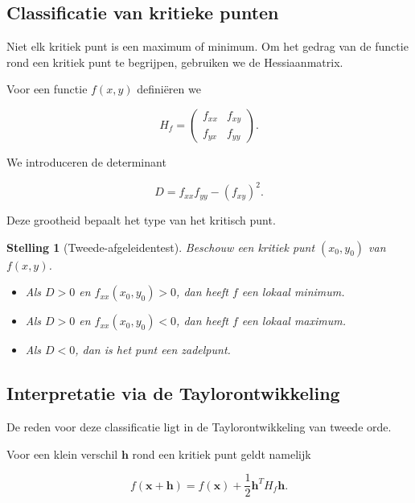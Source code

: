 \documentclass[11pt,a4paper]{article}
\newtheorem{theorem}{Stelling}[section]
\begin{document}
    \subsection{Classificatie van kritieke punten}

    Niet elk kritiek punt is een maximum of minimum.
    Om het gedrag van de functie rond een kritiek punt te begrijpen,
    gebruiken we de Hessiaanmatrix.

    Voor een functie $f(x,y)$ definiëren we

    \[
        H_f =
        \begin{pmatrix}
            f_{xx} & f_{xy} \\
            f_{yx} & f_{yy}
        \end{pmatrix}.
    \]

    We introduceren de determinant

    \[
        D = f_{xx} f_{yy} - (f_{xy})^2.
    \]

    Deze grootheid bepaalt het type van het kritisch punt.

    \begin{theorem}[Tweede-afgeleidentest]

Beschouw een kritiek punt $(x_0,y_0)$ van $f(x,y)$.

\begin{itemize}

    \item Als $D > 0$ en $f_{xx}(x_0,y_0) > 0$,
    dan heeft $f$ een lokaal minimum.

    \item Als $D > 0$ en $f_{xx}(x_0,y_0) < 0$,
    dan heeft $f$ een lokaal maximum.

    \item Als $D < 0$, dan is het punt een zadelpunt.

\end{itemize}

    \end{theorem}

    \subsection{Interpretatie via de Taylorontwikkeling}

    De reden voor deze classificatie ligt in de Taylorontwikkeling
    van tweede orde.

    Voor een klein verschil $\mathbf{h}$ rond een kritiek punt
    geldt namelijk

    \[
        f(\mathbf{x}+\mathbf{h})
        =
        f(\mathbf{x})
        +
        \frac{1}{2}\mathbf{h}^T H_f \mathbf{h}.
    \]
\end{document}
